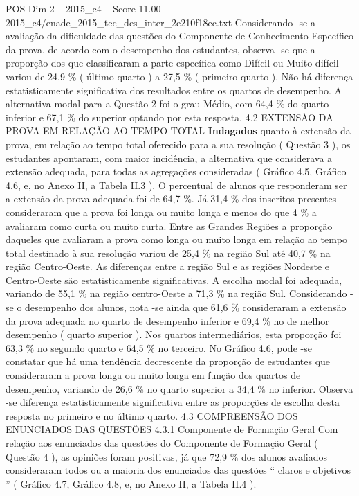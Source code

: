 \begin{textsample}{POS Dim 2 – 2015\_c4 – Score 11.00 – 2015\_c4/enade\_2015\_tec\_des\_inter\_2e210f18ec.txt}
Considerando -se a avaliação da dificuldade das questões do Componente de Conhecimento Específico da prova, de acordo com o desempenho dos estudantes, observa -se que a proporção dos que classificaram a parte específica como Difícil ou Muito difícil variou de 24,9 \% ( último quarto ) a 27,5 \% ( primeiro quarto ).
Não há diferença estatisticamente significativa dos resultados entre os quartos de desempenho.
A alternativa modal para a Questão 2 foi o grau Médio, com 64,4 \% do quarto inferior e 67,1 \% do superior optando por esta resposta. 4.2 EXTENSÃO DA PROVA EM RELAÇÃO AO TEMPO TOTAL \textbf{Indagados} quanto à extensão da prova, em relação ao tempo total oferecido para a sua resolução ( Questão 3 ), os estudantes apontaram, com maior incidência, a alternativa que considerava a extensão adequada, para todas as agregações consideradas ( Gráfico 4.5, Gráfico 4.6, e, no Anexo II, a Tabela II.3 ).
O percentual de alunos que responderam ser a extensão da prova adequada foi de 64,7 \%.
Já 31,4 \% dos inscritos presentes consideraram que a prova foi longa ou muito longa e menos do que 4 \% a avaliaram como curta ou muito curta.
Entre as Grandes Regiões a proporção daqueles que avaliaram a prova como longa ou muito longa em relação ao tempo total destinado à sua resolução variou de 25,4 \% na região Sul até 40,7 \% na região Centro-Oeste.
As diferenças entre a região Sul e as regiões Nordeste e Centro-Oeste são estatisticamente significativas.
A escolha modal foi adequada, variando de 55,1 \% na região centro-Oeste a 71,3 \% na região Sul.
Considerando -se o desempenho dos alunos, nota -se ainda que 61,6 \% consideraram a extensão da prova adequada no quarto de desempenho inferior e 69,4 \% no de melhor desempenho ( quarto superior ).
Nos quartos intermediários, esta proporção foi 63,3 \% no segundo quarto e 64,5 \% no terceiro.
No Gráfico 4.6, pode -se constatar que há uma tendência decrescente da proporção de estudantes que consideraram a prova longa ou muito longa em função dos quartos de desempenho, variando de 26,6 \% no quarto superior a 34,4 \% no inferior.
Observa -se diferença estatisticamente significativa entre as proporções de escolha desta resposta no primeiro e no último quarto. 4.3 COMPREENSÃO DOS ENUNCIADOS DAS QUESTÕES 4.3.1 Componente de Formação Geral Com relação aos enunciados das questões do Componente de Formação Geral ( Questão 4 ), as opiniões foram positivas, já que 72,9 \% dos alunos avaliados consideraram todos ou a maioria dos enunciados das questões “ claros e objetivos ” ( Gráfico 4.7, Gráfico 4.8, e, no Anexo II, a Tabela II.4 ).

\end{textsample}
